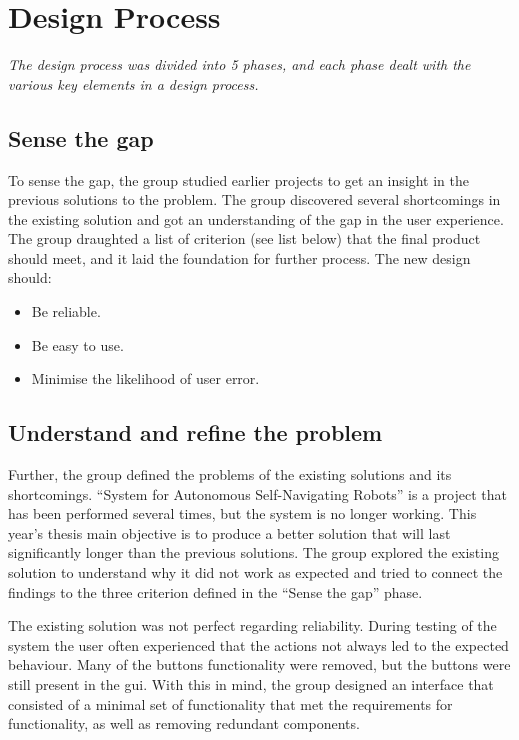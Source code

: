 \section{Design Process}
\label{sec:hcimethod}
\textit{The design process was divided into 5 phases, and each phase dealt with the various key elements in a design process.}

\subsection{Sense the gap}
\label{sec:sensethegap}
To sense the gap, the group studied earlier projects to get an insight in the previous solutions to the problem. The group discovered several shortcomings in the existing solution and got an understanding of the gap in the user experience. The group draughted a list of criterion (see list below) that the final product should meet, and it laid the foundation for further process. The new design should:

\begin{itemize}
    \item Be reliable.
    \item Be easy to use.
    \item Minimise the likelihood of user error.
\end{itemize}

\subsection{Understand and refine the problem}
Further, the group defined the problems of the existing solutions and its shortcomings. ``System for Autonomous Self-Navigating Robots'' is a project that has been performed several times, but the system is no longer working. This year's thesis main objective is to produce a better solution that will last significantly longer than the previous solutions. The group explored the existing solution to understand why it did not work as expected and tried to connect the findings to the three criterion defined in the ``Sense the gap'' phase.

The existing solution was not perfect regarding reliability. During testing of the system the user often experienced that the actions not always led to the expected behaviour. Many of the buttons functionality were removed, but the buttons were still present in the \acrshort{gui}. With this in mind, the group designed an interface that consisted of a minimal set of functionality that met the requirements for functionality, as well as removing redundant components.

